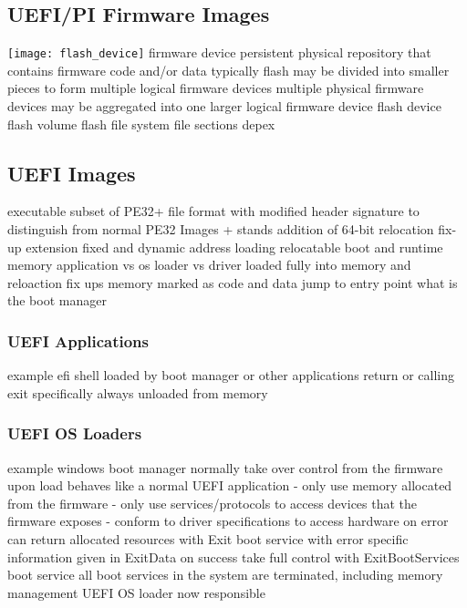 \subsection{\acs{UEFI}/\acs{PI} Firmware Images}

\texttt{[image: flash\_device]}
firmware device
persistent physical repository that contains firmware code and/or data
typically flash
may be divided into smaller pieces to form multiple logical firmware devices
multiple physical firmware devices may be aggregated into one larger logical firmware device
flash device
flash volume
flash file system
file sections
depex

\subsection{\acs{UEFI} Images}

executable
subset of PE32+ file format with modified header signature to distinguish from normal PE32 Images
+ stands addition of 64-bit relocation fix-up extension
fixed and dynamic address loading
relocatable
boot and runtime memory
application vs os loader vs driver
loaded fully into memory and reloaction fix ups
memory marked as code and data
jump to entry point
what is the boot manager

\subsubsection{\acs{UEFI} Applications}

example efi shell
loaded by boot manager or other applications
return or calling exit specifically
always unloaded from memory

\subsubsection{UEFI OS Loaders}

example windows boot manager
normally take over control from the firmware
upon load behaves like a normal UEFI application
- only use memory allocated from the firmware
- only use services/protocols to access devices that the firmware exposes
- conform to driver specifications to access hardware
on error can return allocated resources with Exit boot service with error specific information given in ExitData
on success take full control with ExitBootServices boot service
all boot services in the system are terminated, including memory management
UEFI OS loader now responsible

